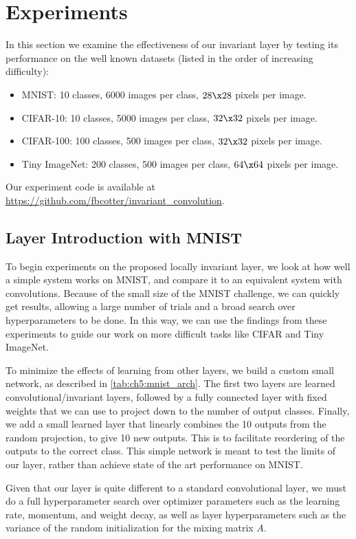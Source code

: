 \section{Experiments}\label{sec:ch5:experiments}
In this section we examine the effectiveness of our invariant layer by testing
its performance on the well known datasets (listed in the order of increasing
difficulty):
\begin{itemize}
  \item MNIST: 10 classes, 6000 images per class, $28\x 28$ pixels per image.
  \item CIFAR-10: 10 classes, 5000 images per class, $32\x 32$ pixels per image.
  \item CIFAR-100: 100 classes, 500 images per class, $32\x 32$ pixels per image. 
  \item Tiny ImageNet\cite{li_tiny_nodate}: 200 classes, 500 images per class, 
    $64 \x 64$ pixels per image. 
\end{itemize}
Our experiment code is available at
\url{https://github.com/fbcotter/invariant_convolution}.

\subsection{Layer Introduction with MNIST}\label{sec:ch5:mnist}
To begin experiments on the proposed locally invariant layer, we look at how
well a simple system works on MNIST, and compare it to an equivalent system with
convolutions. Because of the small size of the MNIST challenge, we can quickly
get results, allowing a large number of trials and a broad search over
hyperparameters to be done. In this way, we can use the findings from these
experiments to guide our work on more difficult tasks like CIFAR and Tiny
ImageNet.

To minimize the effects of learning from other layers, we build a
custom small network, as described in \autoref{tab:ch5:mnist_arch}. 
The first two layers are learned convolutional/invariant layers, followed by
a fully connected layer with fixed weights that we can use to project down to
the number of output classes. Finally, we add a small learned layer that
linearly combines the 10 outputs from the random projection, to give 10 new
outputs. This is to facilitate reordering of the outputs to the correct class.
This simple network is meant to test the limits of our layer, rather than
achieve state of the art performance on MNIST.

Given that our layer is quite different to a standard convolutional layer, we
must do a full hyperparameter search over optimizer parameters such as the
learning rate, momentum, and weight decay, as well as layer hyperparameters 
such as the variance of the random initialization for the mixing matrix $A$.

